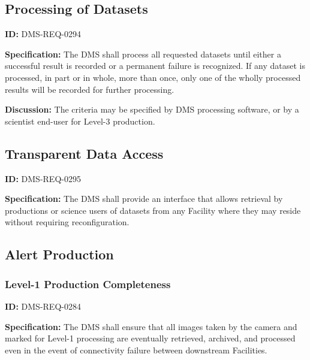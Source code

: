 \documentclass[SE,toc,lsstdraft]{lsstdoc}
\begin{document}
\subsection{Processing of Datasets}

\label{DMS-REQ-0294}
\textbf{ID:} DMS-REQ-0294

\textbf{Specification:} The DMS shall process all requested datasets until either a successful result is recorded or a permanent failure is recognized. If any dataset is processed, in part or in whole, more than once, only one of the wholly processed results will be recorded for further processing.

\textbf{Discussion: }The criteria may be specified by DMS processing software, or by a scientist end-user for Level-3 production.





\subsection{Transparent Data Access}

\label{DMS-REQ-0295}
\textbf{ID:} DMS-REQ-0295

\textbf{Specification:} The DMS shall provide an interface that allows retrieval by productions or science users of datasets from any Facility where they may reside without requiring reconfiguration.







\subsection{Alert Production}





\subsubsection{Level-1 Production Completeness}

\label{DMS-REQ-0284}
\textbf{ID:} DMS-REQ-0284

\textbf{Specification:} The DMS shall ensure that all images taken by the camera and marked for Level-1 processing are eventually retrieved, archived, and processed even in the event of connectivity failure between downstream Facilities.
\end{document}

